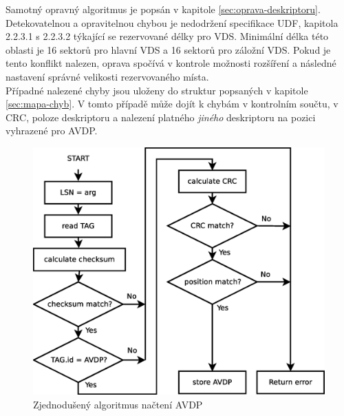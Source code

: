 Samotný opravný algoritmus je popsán v kapitole \ref{sec:oprava-deskriptoru}.\\
Detekovatelnou a opravitelnou chybou je nedodržení specifikace UDF\cite{osta-udf-0201}, kapitola 2.2.3.1 s 2.2.3.2 týkající se rezervované délky pro VDS. Minimální délka této oblasti je 16 sektorů pro hlavní VDS a 16 sektorů pro záložní VDS. Pokud je tento konflikt nalezen, oprava spočívá v kontrole možnosti rozšíření a následné nastavení správné velikosti rezervovaného místa.\\
Případné nalezené chyby jsou uloženy do struktur popsaných v kapitole \ref{sec:mapa-chyb}. V tomto případě může dojít k chybám v kontrolním součtu, v CRC, poloze deskriptoru a nalezení platného \emph{jiného} deskriptoru na pozici vyhrazené pro AVDP.\\
\begin{figure}[ht] 
    \centering
    \includegraphics[scale=0.4]{obrazky/avdp.eps}
    \caption{Zjednodušený algoritmus načtení AVDP}
    \label{fig:avdp}
\end{figure}

